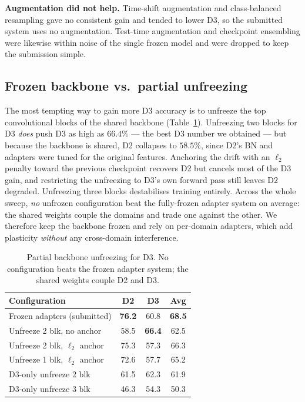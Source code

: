 \documentclass{article}
\begin{document}
\begin{sloppy}
\noindent\textbf{Augmentation did not help.} Time-shift augmentation and
class-balanced resampling gave no consistent gain and tended to lower D3, so
the submitted system uses no augmentation. Test-time augmentation and
checkpoint ensembling were likewise within noise of the single frozen model
and were dropped to keep the submission simple.

\subsection{Frozen backbone vs.\ partial unfreezing}
\label{ssec:discussion}

The most tempting way to gain more D3 accuracy is to unfreeze the top
convolutional blocks of the shared backbone (Table~\ref{tab:unfreeze}).
Unfreezing two blocks for D3 \emph{does} push D3 as high as $66.4\%$ --- the
best D3 number we obtained --- but because the backbone is shared, D2
collapses to $58.5\%$, since D2's BN and adapters were tuned for the original
features. Anchoring the drift with an $\ell_2$ penalty toward the previous
checkpoint recovers D2 but cancels most of the D3 gain, and restricting the
unfreezing to D3's own forward pass still leaves D2 degraded. Unfreezing three
blocks destabilises training entirely. Across the whole sweep, \emph{no}
unfrozen configuration beat the fully-frozen adapter system on average: the
shared weights couple the domains and trade one against the other. We
therefore keep the backbone frozen and rely on per-domain adapters, which add
plasticity \emph{without} any cross-domain interference.

\begin{table}[t]
  \centering
  \caption{Partial backbone unfreezing for D3. No configuration beats the
           frozen adapter system; the shared weights couple D2 and D3.}
  \label{tab:unfreeze}
  \begin{tabularx}{\columnwidth}{Xccc}
    \toprule
    Configuration & D2 & D3 & Avg \\
    \midrule
    Frozen adapters (submitted)        & \textbf{76.2} & 60.8 & \textbf{68.5} \\
    Unfreeze 2 blk, no anchor          & 58.5 & \textbf{66.4} & 62.5 \\
    Unfreeze 2 blk, $\ell_2$ anchor    & 75.3 & 57.3 & 66.3 \\
    Unfreeze 1 blk, $\ell_2$ anchor    & 72.6 & 57.7 & 65.2 \\
    D3-only unfreeze 2 blk             & 61.5 & 62.3 & 61.9 \\
    D3-only unfreeze 3 blk             & 46.3 & 54.3 & 50.3 \\
    \bottomrule
  \end{tabularx}
\end{table}



\end{sloppy}
\end{document}
